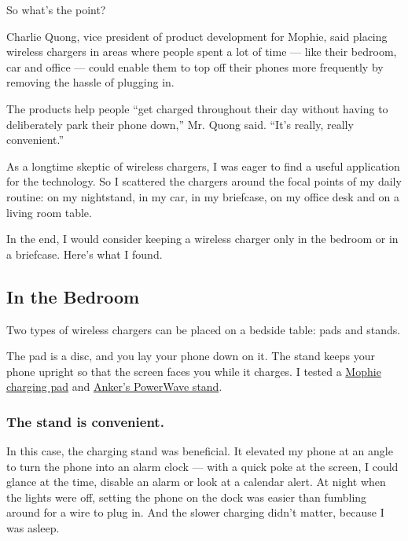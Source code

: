 So what's the point?

Charlie Quong, vice president of product development for Mophie, said
placing wireless chargers in areas where people spent a lot of time ---
like their bedroom, car and office --- could enable them to top off
their phones more frequently by removing the hassle of plugging in.

The products help people ``get charged throughout their day without
having to deliberately park their phone down,'' Mr. Quong said. ``It's
really, really convenient.''

As a longtime skeptic of wireless chargers, I was eager to find a useful
application for the technology. So I scattered the chargers around the
focal points of my daily routine: on my nightstand, in my car, in my
briefcase, on my office desk and on a living room table.

In the end, I would consider keeping a wireless charger only in the
bedroom or in a briefcase. Here's what I found.

\hypertarget{in-the-bedroom}{%
\subsection{In the Bedroom}\label{in-the-bedroom}}

Two types of wireless chargers can be placed on a bedside table: pads
and stands.

The pad is a disc, and you lay your phone down on it. The stand keeps
your phone upright so that the screen faces you while it charges. I
tested a \href{http://www.mophie.com/shop/charge-stream-pad-plus}{Mophie
charging pad} and
\href{https://www.anker.com/products/variant/powerwave-7-5-stand/B2522121}{Anker's
PowerWave stand}.

\hypertarget{the-stand-is-convenient}{%
\subsubsection{The stand is convenient.}\label{the-stand-is-convenient}}

In this case, the charging stand was beneficial. It elevated my phone at
an angle to turn the phone into an alarm clock --- with a quick poke at
the screen, I could glance at the time, disable an alarm or look at a
calendar alert. At night when the lights were off, setting the phone on
the dock was easier than fumbling around for a wire to plug in. And the
slower charging didn't matter, because I was asleep.

